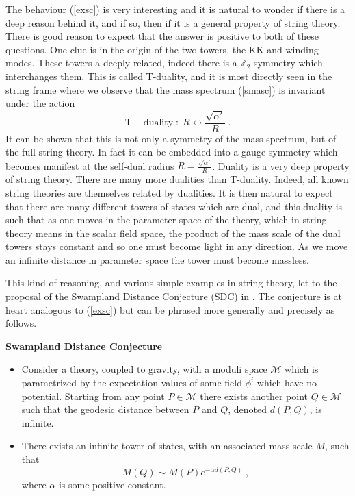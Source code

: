 \documentclass[11pt,a4paper]{article}
\numberwithin{equation}{section}
\numberwithin{table}{section}\setlength{\multlinegap}{25pt}
\newcommand{\cM}{\mathcal M}
\newcommand{\be}{\begin{equation}}
\newcommand{\ee}{\end{equation}}
\begin{document}
The behaviour (\ref{exsc}) is very interesting and it is natural to wonder if there is a deep reason behind it, and if so, then if it is a general property of string theory. There is good reason to expect that the answer is positive to both of these questions. One clue is in the origin of the two towers, the KK and winding modes. These towers a deeply related, indeed there is a ${\mathbb Z}_2$ symmetry which interchanges them. This is called T-duality, and it is most directly seen in the string frame where we observe that the mass spectrum (\ref{smasc}) is invariant under the action
\be
\mathrm{T-duality}\;:\; R \leftrightarrow \frac{\sqrt{\alpha'}}{R} \;.
\ee
It can be shown that this is not only a symmetry of the mass spectrum, but of the full string theory. In fact it can be embedded into a gauge symmetry which becomes manifest at the self-dual radius $R =  \frac{\sqrt{\alpha'}}{R}$. Duality is a very deep property of string theory. There are many more dualities than T-duality. Indeed, all known string theories are themselves related by dualities. It is then natural to expect that there are many different towers of states which are dual, and this duality is such that as one moves in the parameter space of the theory, which in string theory means in the scalar field space, the product of the mass scale of the dual towers stays constant and so one must become light in any direction. As we move an infinite distance in parameter space the tower must become massless.

This kind of reasoning, and various simple examples in string theory, let to the proposal of the Swampland Distance Conjecture (SDC) in \cite{Ooguri:2006in}. The conjecture is at heart analogous to (\ref{exsc}) but can be phrased more generally and precisely as follows. 

\begin{tcolorbox}
{\bf Swampland Distance Conjecture } \;\cite{Ooguri:2006in}
{\it 
\begin{itemize}
\item Consider a theory, coupled to gravity, with a moduli space $\cM$ which is parametrized by the expectation values of some field $\phi^i$ which have no potential. Starting from any point $P \in \cM$ there exists another point $Q \in \cM$ such that the geodesic distance between $P$ and $Q$, denoted $d\left(P,Q\right)$, is infinite. 
\item There exists an infinite tower of states, with an associated mass scale $M$, such that 
\be
\label{sdc}
M\left(Q\right) \sim M\left(P\right) e^{-\alpha d\left(P,Q\right) } \;,
\ee
where $\alpha$ is some positive constant.
\end{itemize}
}
\end{tcolorbox}
\end{document}
